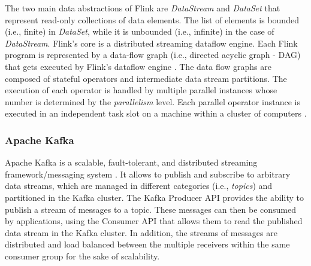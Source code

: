 \par The two main data abstractions of Flink are \textit{DataStream} and \textit{DataSet} that represent read-only collections of data elements. The list of elements is bounded (i.e., finite) in \textit{DataSet}, while it is unbounded (i.e., infinite) in the case of \textit{DataStream}. Flink's core is a distributed streaming dataflow engine. Each
Flink program is represented by a data-flow graph (i.e., directed acyclic graph - DAG) that gets executed by Flink's dataflow engine \cite{carbone2015apache}. The data flow graphs are composed of stateful operators and intermediate data stream partitions.  The execution of each operator is handled by multiple parallel instances whose number is determined by the \textit{parallelism} level. Each parallel operator instance is executed in an independent task slot on a machine within a cluster of computers \cite{Flink}.    

\subsubsection*{Apache Kafka}

\par Apache Kafka is a scalable, fault-tolerant, and distributed streaming framework/messaging system \cite{Kafka}. It allows to publish and subscribe to arbitrary data streams, which are managed in different categories (i.e., \textit{topics}) and  partitioned in the Kafka cluster. The Kafka Producer API provides the ability to publish a stream of messages to a topic. These messages can then be consumed by applications, using the Consumer API that allows them to read the published data stream in the Kafka cluster. In addition, the streams of messages are distributed and load balanced between the multiple receivers within the same consumer group for the sake of scalability.
  





%

